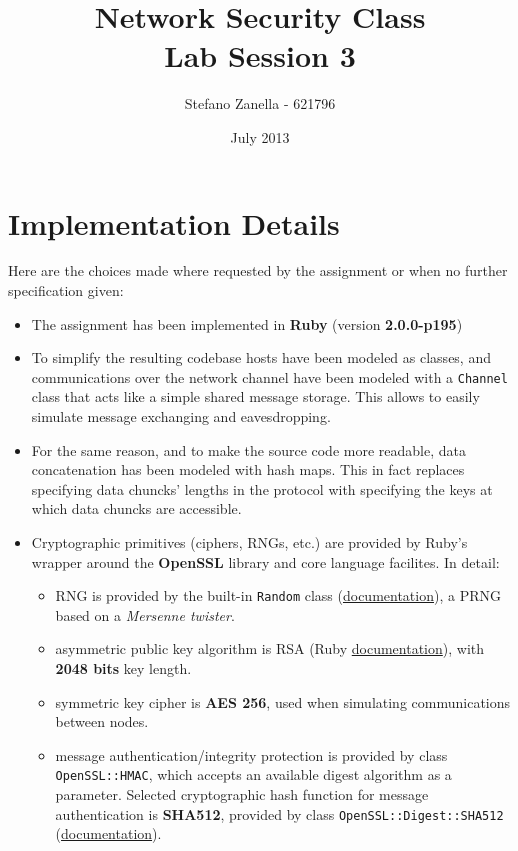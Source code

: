 \documentclass[a4paper,12pt,titlepage]{article}
\begin{document}
\title{Network Security Class \\ Lab Session 3}
\author{Stefano Zanella - 621796}
\date{July 2013}

\maketitle



\section{Implementation Details}
Here are the choices made where requested by the assignment or when no further
specification given:

\begin{itemize}
	\item The assignment has been implemented in \textbf{Ruby} (version \textbf{2.0.0-p195})
	\item To simplify the resulting codebase hosts have been modeled as classes, and
        communications over the network channel have been modeled with a \texttt{Channel}
        class that acts like a simple shared message storage. This allows to easily
        simulate message exchanging and eavesdropping.
	\item For the same reason, and to make the source code more readable, data
        concatenation has been modeled with hash maps. This in fact replaces
        specifying data chuncks' lengths in the protocol with specifying the keys at
        which data chuncks are accessible.
	\item Cryptographic primitives (ciphers, RNGs, etc.) are provided by Ruby's wrapper
        around the \textbf{OpenSSL} library and core language facilites. In detail:

    \begin{itemize}
      \item RNG is provided by the built-in \texttt{Random} class
            (\href{http://ruby-doc.org/core-2.0/Random.html}{documentation}), a PRNG based
            on a \emph{Mersenne twister}.
      \item asymmetric public key algorithm is RSA (Ruby
            \href{http://www.ruby-doc.org/stdlib-2.0/libdoc/openssl/rdoc/OpenSSL/PKey/RSA.html}{documentation}),
            with \textbf{2048 bits} key length.
      \item symmetric key cipher is \textbf{AES 256}, used when simulating communications
            between nodes.
      \item message authentication/integrity protection is provided by class \texttt{OpenSSL::HMAC}, which accepts
            an available digest algorithm as a parameter. Selected cryptographic hash
            function for message authentication is \textbf{SHA512}, provided by class
            \texttt{OpenSSL::Digest::SHA512}
            (\href{http://www.ruby-doc.org/stdlib-2.0/libdoc/openssl/rdoc/OpenSSL/Digest.html}{documentation}).
    \end{itemize}


\end{itemize}
\end{document}
